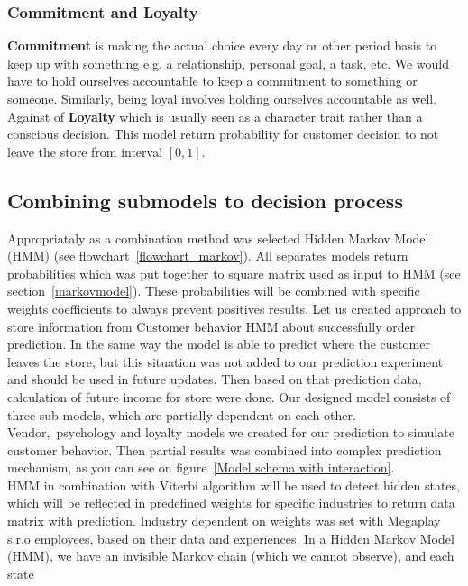 \subsubsection{Commitment and Loyalty} \label{subsubsec:model_loyalty_commitment}
\textbf{Commitment} is making the actual choice every day or other period basis to keep up with something e.g. a relationship, personal goal, a task, etc.
We would have to hold ourselves accountable to keep a commitment to something or someone.
Similarly, being loyal involves holding ourselves accountable as well.\\
Against of \textbf{Loyalty} which is usually seen as a character trait rather than a conscious decision.
This model return probability for customer decision to not leave the store from interval $[0,1]$.\\
\subsection{Combining submodels to decision process} \label{subsec:combining_models}
Appropriataly as a combination method was selected Hidden Markov Model (HMM) (see flowchart~\ref{flowchart_markov}).
All separates models return probabilities which was put together to square matrix used as input to HMM (see section~\ref{markovmodel}).
These probabilities will be combined with specific weights coefficients to always prevent positives results.
Let us created approach to store information from Customer behavior HMM about successfully order prediction.
In the same way the model is able to predict where the customer leaves the store, but this situation was not added to our prediction experiment and should be used in future updates.
Then based on that prediction data, calculation of future income for store were done.
Our designed model consists of three sub-models, which are partially dependent on each other.
Vendor,\ psychology and loyalty models we created for our prediction to simulate customer behavior.
Then partial results was combined into complex prediction mechanism, as you can see on figure~\ref{Model schema with interaction}.
\\
HMM in combination with Viterbi algorithm will be used to detect hidden states, which will be reflected in predefined weights for specific
industries to return data matrix with prediction.
Industry dependent on weights was set with Megaplay s.r.o employees, based on their data and experiences.
In a Hidden Markov Model (HMM), we have an invisible Markov chain (which we cannot observe), and each state
